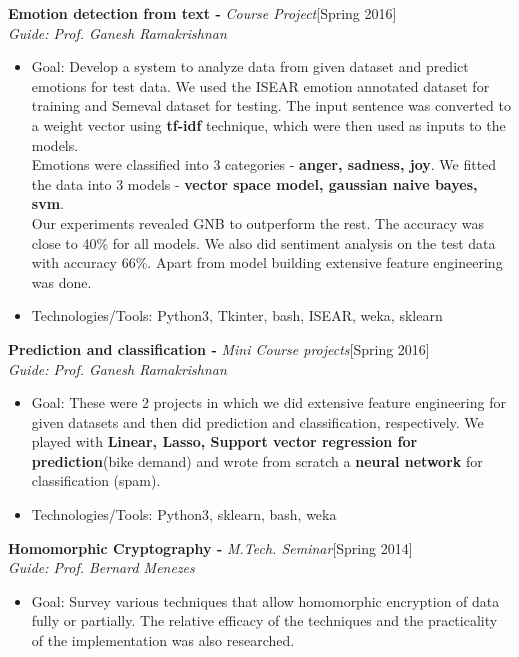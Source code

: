 \documentclass[a4paper,10pt]{article}
\begin{document}
\noindent
\textbf{Emotion detection from text -} \emph{Course Project}\hfill[Spring 2016] \\
\emph{Guide: Prof. Ganesh Ramakrishnan}
\begin{itemize}
 \item Goal: Develop a system to analyze data from given dataset and predict emotions for test data. We used the ISEAR emotion annotated dataset for training and Semeval dataset for testing. The input sentence was converted to a weight vector using \textbf{tf-idf} technique, which were then used as inputs to the models.\\
 Emotions were classified into 3 categories - \textbf{anger, sadness, joy}. We fitted the data into 3 models - \textbf{vector space model, gaussian naive bayes, svm}. \\
 Our experiments revealed GNB to outperform the rest. The accuracy was close to 40\% for all models. We also did sentiment analysis on the test data with accuracy 66\%. Apart from model building extensive feature engineering was done.
 \item Technologies/Tools: Python3, Tkinter, bash, ISEAR, weka, sklearn
\end{itemize}

\noindent
\textbf{Prediction and classification -} \emph{Mini Course projects}\hfill[Spring 2016] \\
\emph{Guide: Prof. Ganesh Ramakrishnan}
\begin{itemize}
	\item Goal: These were 2 projects in which we did extensive feature engineering for given datasets and then did prediction and classification, respectively. We played with \textbf{Linear, Lasso, Support vector regression for prediction}(bike demand) and wrote from scratch a \textbf{neural network} for classification (spam).
  \item Technologies/Tools: Python3, sklearn, bash, weka
\end{itemize}

\noindent
\textbf{Homomorphic Cryptography -} \emph{M.Tech. Seminar}\hfill[Spring 2014] \\
\emph{Guide: Prof. Bernard Menezes}
\begin{itemize}
 \item Goal: Survey various techniques that allow homomorphic encryption of data fully or partially. The relative efficacy of the techniques and the practicality of the implementation was also researched.
\end{itemize}
\end{document}
